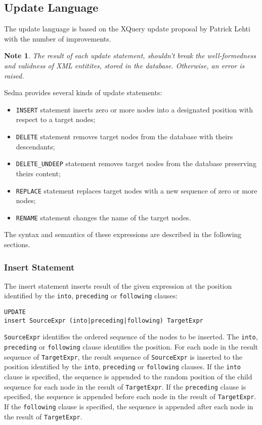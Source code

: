 \documentclass[a4paper,12pt]{article}
\newtheorem{note}{Note}    %
\newenvironment{citemize}
{\begin{itemize}
  \setlength{\itemsep}{0pt}
  \setlength{\parskip}{0pt}
  \setlength{\parsep}{0pt}}
{\end{itemize}}
\begin{document}
\subsection{Update Language}
\label{upd-lang}

The update language is based on the XQuery update proposal by Patrick Lehti
\cite{paper:query-update} with the number of improvements.

\begin{note}
The result of each update statement, shouldn't break the well-formedness and
validness of XML entitites, stored in the database. Otherwise, an error is
raised.
\end{note}

Sedna provides several kinds of update statements:
\begin{citemize}
\item\verb!INSERT! statement inserts zero or more nodes into a designated
position with respect to a target nodes;
\item\verb!DELETE! statement removes target nodes from the database with theirs
descendants;
\item\verb!DELETE_UNDEEP! statement removes target nodes from the database
preserving theirs content;
\item\verb!REPLACE! statement replaces target nodes with a new sequence of zero
or more nodes;
\item\verb!RENAME! statement changes the name of the target nodes.
\end{citemize}
The syntax and semantics of these expressions are described in the following
sections.


\subsubsection*{Insert Statement}
The insert statement inserts result of the given expression at the position
identified by the \verb!into!, \verb!preceding! or \verb!following! clauses:

\begin{verbatim}
UPDATE
insert SourceExpr (into|preceding|following) TargetExpr
\end{verbatim}
\verb!SourceExpr! identifies the ordered sequence of the nodes to be inserted.
The \verb!into!, \verb!preceding! or \verb!following! clause identifies the
position. For each node in the result sequence of \verb!TargetExpr!, the result
sequence of \verb!SourceExpr! is inserted to the position identified by the
\verb!into!, \verb!preceding! or \verb!following! clauses. If the \verb!into!
clause is specified, the sequence is appended to the random position of the
child sequence for each node in the result of \verb!TargetExpr!. If the
\verb!preceding! clause is specified, the sequence is appended before each node
in the result of \verb!TargetExpr!. If the \verb!following! clause is specified,
the sequence is appended after each node in the result of \verb!TargetExpr!.
\end{document}
